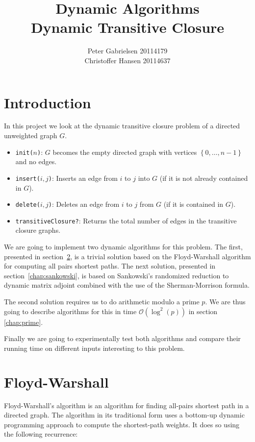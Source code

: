 \documentclass[a4paper,oneside,article,11pt]{memoir}
\title{Dynamic Algorithms \\ Dynamic Transitive Closure }
\author{Peter Gabrielsen 20114179 \\
Christoffer Hansen 20114637}
\begin{document}
\maketitle
\thispagestyle{empty}
\clearpage
\tableofcontents
\clearpage

\chapter{Introduction}
In this project we look at the dynamic transitive closure problem of a directed unweighted graph $G$.

\begin{itemize}
\item{\texttt{init($n$)}: $G$ becomes the empty directed graph with vertices $\left\lbrace 0,\dots, n-1\right\rbrace$ and no edges.}
\item{\texttt{insert($i,j$)}: Inserts an edge from $i$ to $j$ into $G$ (if it is not already contained in $G$).}
\item{\texttt{delete($i,j$)}: Deletes an edge from $i$ to $j$ from $G$ (if it is contained in $G$).}
\item{\texttt{transitiveClosure?}: Returns the total number of edges in the transitive closure graphs.}
\end{itemize}

We are going to implement two dynamic algorithms for this problem. The first, presented in section~\ref{chap:fw}, is a trivial solution based on the Floyd-Warshall algorithm for computing all pairs shortest paths. The next solution, presented in section~\ref{chap:sankowski}, is based on Sankowski's randomized reduction to dynamic matrix adjoint combined with the use of the Sherman-Morrison formula.

The second solution requires us to do arithmetic modulo a prime $p$. We are thus going to describe algorithms for this in time $\mathcal{O}(\log^2(p))$ in section \ref{chap:prime}.

Finally we are going to experimentally test both algorithms and compare their running time on different inputs interesting to this problem.


\chapter{Floyd-Warshall}
\label{chap:fw}

Floyd-Warshall's algorithm is an algorithm for finding all-pairs shortest path in a directed graph. The algorithm in its traditional form uses a bottom-up dynamic programming approach to compute the shortest-path weights. It does so using the following recurrence:
\end{document}
